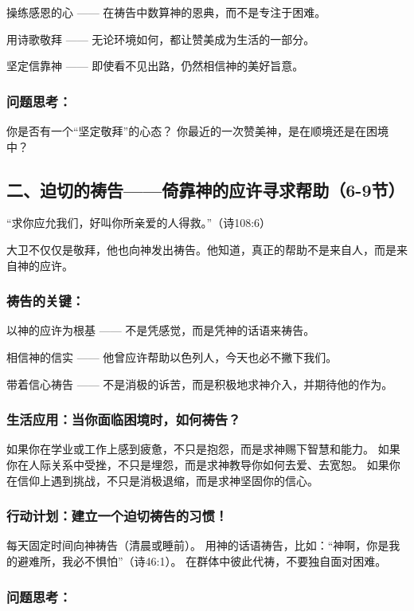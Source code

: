 \documentclass[a4paper, 12pt]{article}
\begin{document}
\hspace{0.6cm}操练感恩的心 —— 在祷告中数算神的恩典，而不是专注于困难。

用诗歌敬拜 —— 无论环境如何，都让赞美成为生活的一部分。

坚定信靠神 —— 即使看不见出路，仍然相信神的美好旨意。
\subsubsection*{问题思考：}

你是否有一个“坚定敬拜”的心态？
你最近的一次赞美神，是在顺境还是在困境中？
\subsection*{二、迫切的祷告——倚靠神的应许寻求帮助（6-9节）}
“求你应允我们，好叫你所亲爱的人得救。”（诗108:6）

大卫不仅仅是敬拜，他也向神发出祷告。他知道，真正的帮助不是来自人，而是来自神的应许。

\subsubsection*{祷告的关键：}

\hspace{0.6cm}以神的应许为根基 —— 不是凭感觉，而是凭神的话语来祷告。

相信神的信实 —— 他曾应许帮助以色列人，今天也必不撇下我们。

带着信心祷告 —— 不是消极的诉苦，而是积极地求神介入，并期待他的作为。
\subsubsection*{生活应用：当你面临困境时，如何祷告？}

如果你在学业或工作上感到疲惫，不只是抱怨，而是求神赐下智慧和能力。
如果你在人际关系中受挫，不只是埋怨，而是求神教导你如何去爱、去宽恕。
如果你在信仰上遇到挑战，不只是消极退缩，而是求神坚固你的信心。
\subsubsection*{行动计划：建立一个迫切祷告的习惯！}

每天固定时间向神祷告（清晨或睡前）。
用神的话语祷告，比如：“神啊，你是我的避难所，我必不惧怕”（诗46:1）。
在群体中彼此代祷，不要独自面对困难。
\subsubsection*{问题思考：}
\end{document}
